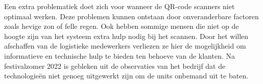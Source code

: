 Een extra problematiek doet zich voor wanneer de QR-code scanners niet optimaal werken. Deze problemen kunnen ontstaan door onveranderbare factoren zoals hevige zon of felle regen. Ook hebben sommige mensen die niet op de hoogte zijn van het systeem extra hulp nodig bij het scannen. Door het willen afschaffen van de logistieke medewerkers verliezen ze hier de mogelijkheid om informatieve en technische hulp te bieden ten behoeve van de klanten. Na festivalzomer 2022 is gebleken uit de observaties van het bedrijf dat de technologieën niet genoeg uitgewerkt zijn om de units onbemand uit te baten.

\newpage
\section{}%
\label{sec:onderzoeksvraag}

\begin{comment}
    Wees zo concreet mogelijk bij het formuleren van je onderzoeksvraag. Een onderzoeksvraag is trouwens iets waar nog niemand op dit moment een antwoord heeft (voor zover je kan nagaan). Het opzoeken van bestaande informatie (bv. ``welke tools bestaan er voor deze toepassing?'') is dus geen onderzoeksvraag. Je kan de onderzoeksvraag verder specifiëren in deelvragen. Bv.~als je onderzoek gaat over performantiemetingen, dan  
\end{comment}

\section{}%
\label{sec:onderzoeksdoelstelling}
\begin{comment}
    Wat is het beoogde resultaat van je bachelorproef? Wat zijn de criteria voor succes? Beschrijf die zo concreet mogelijk. Gaat het bv.\ om een proof-of-concept, een prototype, een verslag met aanbevelingen, een vergelijkende studie, enz.
\end{comment}


\section{}%
\label{sec:opzet-bachelorproef}


